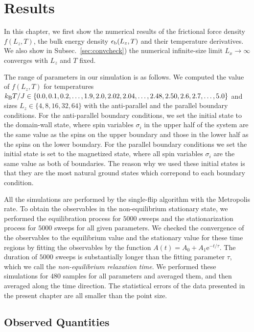 \chapter{Results}\label{chap:Res}

In this chapter, we first show the numerical results of the frictional force density $f(L_{z}, T)$, the bulk energy density $\epsilon_{\rm b}(L_{z}, T)$ and their temperature derivatives. We also show in Subsec.~\ref{sec:convcheck}) the numerical infinite-size limit $L_{x}\to\infty$ converges with $L_{z}$ and $T$ fixed.

The range of parameters in our simulation is as follows. We computed the value of $f(L_{z}, T)$ for temperatures $k_{\rm B}T/J\in\{0.0,0.1,0.2,\dots,1.9,2.0,2.02,2.04,\dots,2.48,2.50,2.6,2.7,\dots,5.0\}$ and sizes $L_{z}\in\{4,8,16,32,64\}$ with the anti-parallel and the parallel boundary conditions. For the anti-parallel boundary conditions, we set the initial state to the domain-wall state, where spin variables $\sigma_{i}$ in the upper half of the system are the same value as the spins on the upper boundary and those in the lower half as the spins on the lower boundary. For the parallel boundary conditions we set the initial state is set to the magnetized state, where all spin variables $\sigma_{i}$ are the same value as both of boundaries. The reason why we used these initial states is that they are the most natural ground states which correpond to each boundary condition.

All the simulations are performed by the single-flip algorithm with the Metropolis rate. To obtain the observables in the non-equilibrium stationary state, we performed the equilibration process for $5000$ sweeps and the stationarization process for $5000$ sweeps for all given parameters. We checked the convergence of the observables to the equilibrium value and the stationary value for these time regions by fitting the observables by the function $A(t)=A_{0} + A_{1}\mathrm{e}^{-t/\tau}$. The duration of $5000$ sweeps is substantially longer than the fitting parameter $\tau$, which we call the \textit{non-equilibrium relaxation time}. We performed these simulations for $480$ samples for all parameters and averaged them, and then averaged along the time direction. The statistical errors of the data presented in the present chapter are all smaller than the point size.

\section{Observed Quantities}\label{sec:NEMCs}

